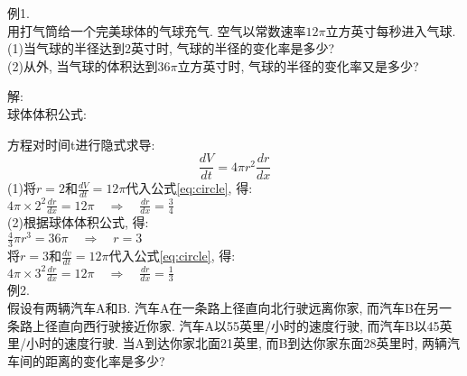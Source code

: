 例1.\\
用打气筒给一个完美球体的气球充气. 空气以常数速率$12\pi$立方英寸每秒进入气球.\\
(1)当气球的半径达到$2$英寸时, 气球的半径的变化率是多少?\\
(2)从外, 当气球的体积达到$36\pi$立方英寸时, 气球的半径的变化率又是多少?

解:\\
球体体积公式:\\[-2ex]
\begin{center}
\end{center}
方程对时间t进行隐式求导:
\begin{equation}
\displaystyle\frac{dV}{dt}=4\pi r^2\frac{dr}{dx}\label{eq:circle}
\end{equation}
(1)将$r=2$和$\frac{dV}{dt}=12\pi$代入公式\eqref{eq:circle}, 得:\\[1ex]
\phantom{(1)}$\displaystyle 4\pi\times 2^2\frac{dr}{dx}=12\pi\quad\Rightarrow\quad\frac{dr}{dx}=\frac{3}{4}$\\[1ex]
(2)根据球体体积公式, 得:\\[1ex]
\phantom{(2)}$\displaystyle\frac{4}{3}\pi r^3=36\pi\quad\Rightarrow\quad r=3$\\[1ex]
\phantom{(2)}将$r=3$和$\frac{dv}{dt}=12\pi$代入公式\eqref{eq:circle}, 得:\\[1ex]
\phantom{(2)}$\displaystyle 4\pi\times 3^2\frac{dr}{dx}=12\pi\quad\Rightarrow\quad\frac{dr}{dx}=\frac{1}{3}$\\[2ex]

例2.\\
假设有两辆汽车A和B. 汽车A在一条路上径直向北行驶远离你家, 而汽车B在另一条路上径直向西行驶接近你家. 汽车A以55英里/小时的速度行驶, 而汽车B以45英里/小时的速度行驶. 当A到达你家北面21英里, 而B到达你家东面28英里时, 两辆汽车间的距离的变化率是多少?

